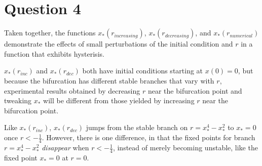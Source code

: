 \documentclass{article}
\begin{document}
\pagebreak

\section*{Question 4}
Taken together, the functions \(x_*(r_{increasing})\), \(x_*(r_{decreasing})\),
and \(x_*(r_{numerical})\) demonstrate the effects of small perturbations of
the initial condition and \(r\) in a function that exhibits hysterisis.

\(x_*(r_{inc})\) and \(x_*(r_{dec})\) both have initial conditions starting at
\(x(0) = 0\), but because the bifurcation has different stable branches that vary
with \(r\), experimental results obtained by decreasing \(r\) near the bifurcation
point and tweaking \(x_*\) will be different from those yielded by increasing \(r\)
near the bifurcation point.

Like \(x_*(r_{inc})\), \(x_*(r_{dec})\) jumps from the stable branch on
\(r = x_*^4 - x_*^2\) to \(x_* = 0\) once \(r < -\frac{1}{4}\). However, there
is one difference, in that the fixed points for branch \(r = x_*^4 - x_*^2\)
\emph{disappear} when \(r < -\frac{1}{4}\), instead of merely becoming unstable,
like the fixed point \(x_* = 0\) at \(r = 0\).
\end{document}
